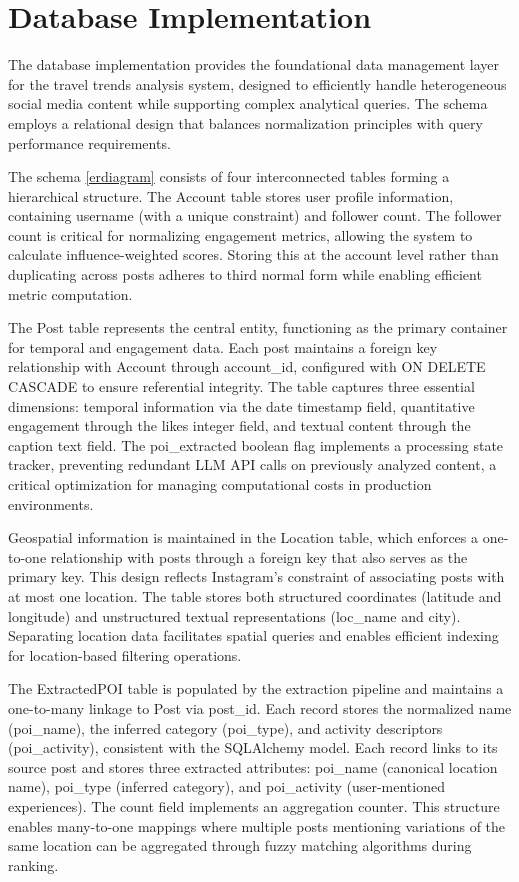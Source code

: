 \documentclass[a4paper,12pt]{report}
\begin{document}
\section{Database Implementation}

The database implementation provides the foundational data management layer for the travel trends analysis system, designed to efficiently handle heterogeneous social media content while supporting complex analytical queries. The schema employs a relational design that balances normalization principles with query performance requirements.

The schema \ref{erdiagram} consists of four interconnected tables forming a hierarchical structure. The Account table stores user profile information, containing username (with a unique constraint) and follower count. The follower count is critical for normalizing engagement metrics, allowing the system to calculate influence-weighted scores. Storing this at the account level rather than duplicating across posts adheres to third normal form while enabling efficient metric computation.

The Post table represents the central entity, functioning as the primary container for temporal and engagement data. Each post maintains a foreign key relationship with Account through account\_id, configured with ON DELETE CASCADE to ensure referential integrity. The table captures three essential dimensions: temporal information via the date timestamp field, quantitative engagement through the likes integer field, and textual content through the caption text field. The poi\_extracted boolean flag implements a processing state tracker, preventing redundant LLM API calls on previously analyzed content, a critical optimization for managing computational costs in production environments.

Geospatial information is maintained in the Location table, which enforces a one-to-one relationship with posts through a foreign key that also serves as the primary key. This design reflects Instagram's constraint of associating posts with at most one location. The table stores both structured coordinates (latitude and longitude) and unstructured textual representations (loc\_name and city). Separating location data facilitates spatial queries and enables efficient indexing for location-based filtering operations.

The ExtractedPOI table is populated by the extraction pipeline and maintains a one-to-many linkage to Post via post\_id. Each record stores the normalized name (poi\_name), the inferred category (poi\_type), and activity descriptors (poi\_activity), consistent with the SQLAlchemy model. Each record links to its source post and stores three extracted attributes: poi\_name (canonical location name), poi\_type (inferred category), and poi\_activity (user-mentioned experiences). The count field implements an aggregation counter. This structure enables many-to-one mappings where multiple posts mentioning variations of the same location can be aggregated through fuzzy matching algorithms during ranking.
\end{document}
